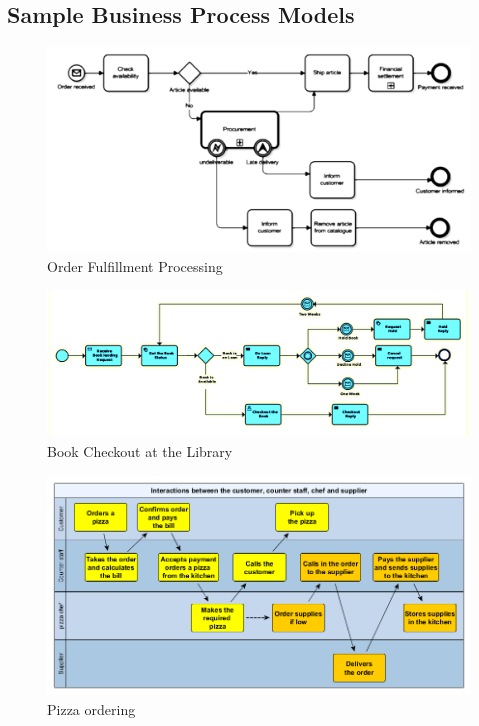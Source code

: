 \documentclass[]{book}
\begin{document}
\hypertarget{sample-business-process-models}{%
\subsection{Sample Business Process Models}\label{sample-business-process-models}}

\begin{figure}
\centering
\includegraphics{images/orderfulfillment.png}
\caption{Order Fulfillment Processing}
\end{figure}

\begin{figure}
\centering
\includegraphics{images/bookckout.png}
\caption{Book Checkout at the Library}
\end{figure}

\begin{figure}
\centering
\includegraphics{images/pizza.png}
\caption{Pizza ordering}
\end{figure}
\end{document}
